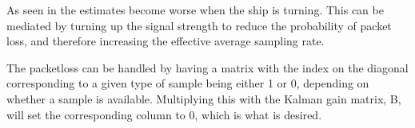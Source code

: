  As seen in  the estimates become worse when the ship is turning. This can be mediated by turning up the signal strength to reduce the probability of packet loss, and therefore increasing the effective average sampling rate. 

The packetloss can be handled by having a matrix with the index on the diagonal corresponding to a given type of sample being either 1 or 0, depending on whether a sample is available. Multiplying this with the Kalman gain matrix, B, will set the corresponding column to 0, which is what is desired.
